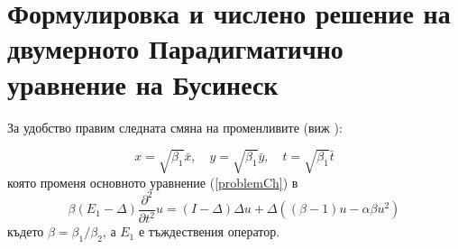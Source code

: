 \documentclass{article}
\newcommand{\be}{\begin{equation}}
\newcommand{\ee}{\end{equation}}
\newcommand{\rf}[1]{(\ref{#1})}
\theoremstyle{remark}
\begin{document}
\bigskip


\section{Формулировка и числено решение на двумерното Парадигматично уравнение на Бусинеск}\label{hiperbolicFormulation}

За удобство правим следната смяна на променливите (виж \cite{ref25}):

\be\label{vcHyp}
x = \sqrt{\beta_1} \bar{x}, \quad y = \sqrt{\beta_1} \bar{y}, \quad t = \sqrt{\beta_1} \bar{t} 
\ee
която променя основното уравнение \rf{problemCh} в
\be\label{problemVC}
 \beta (E_1-\Delta) \frac{\partial^2}{\partial t^2}u= 
(I-\Delta)\Delta u +\Delta( (\beta - 1 )u - \alpha \beta u^2 )
\ee
където $\beta = \beta_1/\beta_2$, а $E_1$ е тъждествения оператор. 
\end{document}
